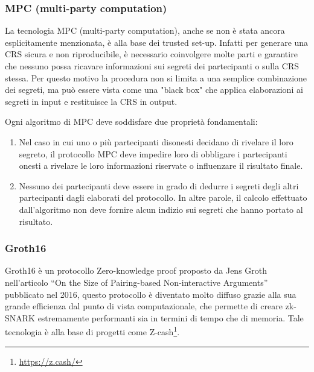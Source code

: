 \subsubsection{MPC (multi-party computation)}
La tecnologia MPC (multi-party computation), anche se non è stata ancora esplicitamente menzionata, è alla base dei
trusted set-up. Infatti per generare una CRS sicura e non riproducibile, è necessario coinvolgere molte parti e
garantire che nessuno possa ricavare informazioni sui segreti dei partecipanti o sulla CRS stessa. Per questo motivo la
procedura non si limita a una semplice combinazione dei segreti, ma può essere vista come una "black box" che applica
elaborazioni ai segreti in input e restituisce la CRS in output.

Ogni algoritmo di MPC deve soddisfare due proprietà fondamentali:

\begin{enumerate}
    \item Nel caso in cui uno o più partecipanti disonesti decidano di rivelare il loro segreto, il protocollo MPC deve
    impedire loro di obbligare i partecipanti onesti a rivelare le loro informazioni riservate o influenzare il risultato
    finale.
    \item Nessuno dei partecipanti deve essere in grado di dedurre i segreti degli altri partecipanti dagli elaborati
    del protocollo. In altre parole, il calcolo effettuato dall'algoritmo non deve fornire alcun indizio sui segreti che
    hanno portato al risultato.
\end{enumerate}

\subsubsection{Groth16}
Groth16 è un protocollo Zero-knowledge proof proposto da Jens Groth nell’articolo “On the Size of Pairing-based
Non-interactive Arguments” \cite{10.1007/978-3-662-49896-5_11} pubblicato nel 2016, questo protocollo è diventato molto
diffuso grazie alla sua grande efficienza dal punto di vista computazionale, che permette di creare zk-SNARK
estremamente performanti sia in termini di tempo che di memoria. Tale tecnologia è alla base di progetti come Z-cash\footnote{\url{https://z.cash/}}.

